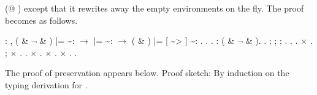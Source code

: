 \documentclass[12pt]{report}
\begin{document}
     (@ ) except that it rewrites away the
    empty environments on the fly. The proof becomes as follows.
\begin{coqdoccode}
\coqdocemptyline
\coqdocnoindent
{}  : \coqdockw{\ensuremath{\forall}}       ,\coqdoceol
\coqdocindent{1.00em}
( \&  \ensuremath{\lnot}  \& ) |=  \~{}:  \ensuremath{\rightarrow}\coqdoceol
\coqdocindent{1.00em}
 |=  \~{}:  \ensuremath{\rightarrow}\coqdoceol
\coqdocindent{1.00em}
( \& ) |= [ \~{}> ] \~{}: .\coqdoceol
\coqdocnoindent
{}.\coqdoceol
\coqdocindent{1.00em}
  .  : ( \&  \ensuremath{\lnot}  \& ).  .\coqdoceol
\coqdocindent{1.00em}
 ;   ; ;  .\coqdoceol
\coqdocindent{1.00em}
.\coqdoceol
\coqdocindent{2.00em}
 . \ensuremath{\times} .\coqdoceol
\coqdocindent{2.00em}
 ; \ensuremath{\times} .\coqdoceol
\coqdocindent{1.00em}
   .\coqdoceol
\coqdocindent{1.50em}
\ensuremath{\times} . \ensuremath{\times} .\coqdoceol
\coqdocindent{1.00em}
\ensuremath{\times} .\coqdoceol
\coqdocnoindent
{}.\coqdoceol
\coqdocemptyline
\end{coqdoccode}
The proof of preservation appears below.
    Proof sketch: By induction on the typing derivation for .
\end{document}
